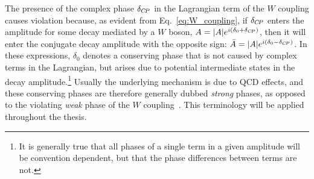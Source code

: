 The presence of the complex phase $\delta_{{C\!P}}$ in the Lagrangian term of the $W$ coupling causes \CP violation because, as evident from Eq.~\eqref{eq:W_coupling}, if $\delta_{{C\!P}}$ enters the amplitude for some decay mediated by a $W$ boson, $A=|A|e^{i(\delta_0 + \delta_{{C\!P}})}$, then it will enter the \CP conjugate decay amplitude with the opposite sign: $\bar A=|A|e^{i(\delta_0 - \delta_{{C\!P}})}$. In these expressions, $\delta_0$ denotes a \CP conserving phase that is not caused by complex terms in the Lagrangian, but arises due to potential intermediate states in the decay amplitude.\footnote{It is generally true that all phases of a single term in a given amplitude will be convention dependent, but that the phase differences between terms are not.} Usually the underlying mechanism is due to QCD effects, and these \CP conserving phases are therefore generally dubbed \emph{strong} phases, as opposed to the \CP violating \emph{weak} phase of the $W$ coupling~\cite{PDG2020}. This terminology will be applied throughout the thesis. 

